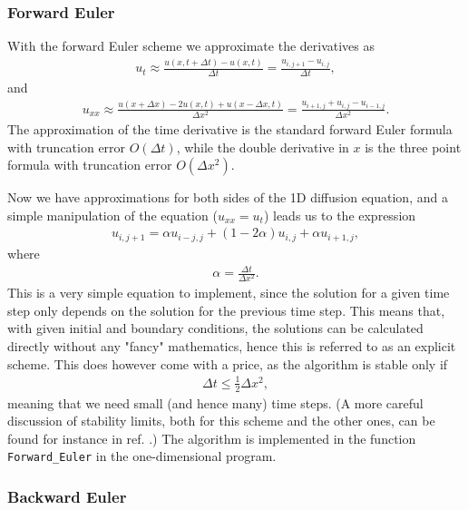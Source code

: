 \documentclass[12pt, a4paper]{article}
\begin{document}
\subsubsection{Forward Euler}

With the forward Euler scheme we approximate the derivatives as  
\begin{align*}
u_t \approx \frac{u(x,t+\Delta t) - u(x,t)}{\Delta t} = \frac{u_{i,j+1}- u_{i,j}}{\Delta t}, 
\end{align*}
and 
\begin{align*}
u_{xx} \approx \frac{u(x+\Delta x) - 2 u(x,t) + u(x-\Delta x,t)}{\Delta x^2} 
			=  \frac{u_{i+1,j} + u_{i,j} - u_{i-1,j}}{\Delta x^2}. 
\end{align*}
The approximation of the time derivative is the standard forward Euler formula with truncation error 
$O(\Delta t)$, while the double derivative in $x$ is the three point formula with truncation error 
$O(\Delta x^2)$. 

Now we have approximations for both sides of the 1D diffusion equation, and a simple manipulation of 
the equation ($u_{xx} = u_t$) leads us to the expression 
\begin{align}
u_{i,j+1} = \alpha u_{i-j,j} + (1-2\alpha)u_{i,j} + \alpha u_{i+1,j},
\label{eq:FE}
\end{align}
where 
\begin{align*}
\alpha = \frac{\Delta t}{\Delta x^2}. 
\end{align*}
This is a very simple equation to implement, since the solution for a given time step only depends on 
the solution for the previous time step. This means that, with given initial and boundary conditions, 
the solutions can be calculated directly without any "fancy" mathematics, hence this is referred to as 
an explicit scheme. This does however come with a price, as the algorithm is stable only if 
\begin{align*}
\Delta t \leq \frac{1}{2} \Delta x^2, 
\end{align*}
meaning that we need small (and hence many) time steps. (A more careful discussion of stability limits, 
both for this scheme and the other ones, can be found for instance in ref. \cite{Lecture Notes}.) 
The algorithm is implemented in the function 
\texttt{Forward\_Euler} in the one-dimensional program. 

\subsubsection{Backward Euler}
\end{document}
